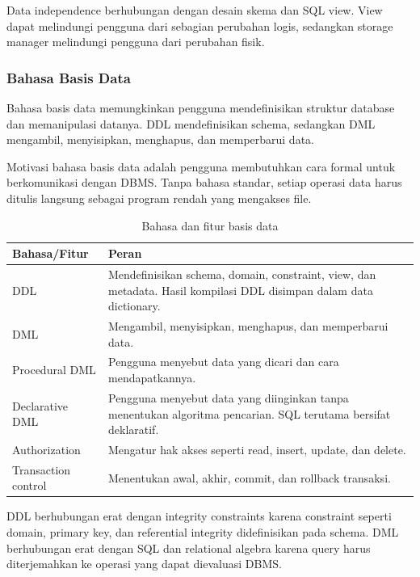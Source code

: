 Data independence berhubungan dengan desain skema dan SQL view. View dapat melindungi pengguna dari sebagian perubahan logis, sedangkan storage manager melindungi pengguna dari perubahan fisik.

\subsubsection{Bahasa Basis Data}

\begin{jawab}
Bahasa basis data memungkinkan pengguna mendefinisikan struktur database dan memanipulasi datanya. DDL mendefinisikan schema, sedangkan DML mengambil, menyisipkan, menghapus, dan memperbarui data.
\end{jawab}

Motivasi bahasa basis data adalah pengguna membutuhkan cara formal untuk berkomunikasi dengan DBMS. Tanpa bahasa standar, setiap operasi data harus ditulis langsung sebagai program rendah yang mengakses file.

\begin{table}[H]
\centering
\begin{tabularx}{\textwidth}{|L{0.25\textwidth}|X|}
\hline
\textbf{Bahasa/Fitur} & \textbf{Peran} \\
\hline
DDL & Mendefinisikan schema, domain, constraint, view, dan metadata. Hasil kompilasi DDL disimpan dalam data dictionary. \\
\hline
DML & Mengambil, menyisipkan, menghapus, dan memperbarui data. \\
\hline
Procedural DML & Pengguna menyebut data yang dicari dan cara mendapatkannya. \\
\hline
Declarative DML & Pengguna menyebut data yang diinginkan tanpa menentukan algoritma pencarian. SQL terutama bersifat deklaratif. \\
\hline
Authorization & Mengatur hak akses seperti read, insert, update, dan delete. \\
\hline
Transaction control & Menentukan awal, akhir, commit, dan rollback transaksi. \\
\hline
\end{tabularx}
\caption{Bahasa dan fitur basis data}
\label{tab:database-languages}
\end{table}

DDL berhubungan erat dengan integrity constraints karena constraint seperti domain, primary key, dan referential integrity didefinisikan pada schema. DML berhubungan erat dengan SQL dan relational algebra karena query harus diterjemahkan ke operasi yang dapat dievaluasi DBMS.

